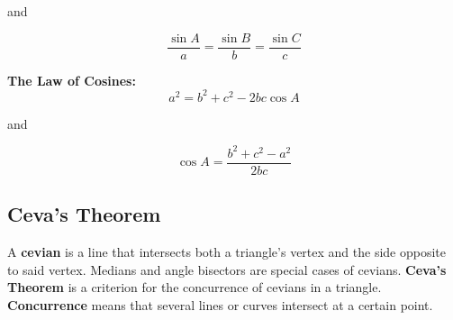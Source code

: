         \noindent and

        \begin{equation*}
            \frac{\sin{A}}{a} = \frac{\sin{B}}{b} = \frac{\sin{C}}{c}
        \end{equation*}

        \begin{center}
        \end{center}

        \noindent \color{purple} \textbf{The Law of Cosines:} \color{black} \\

        \begin{equation*}
            a^2 = b^2 + c^2 -2bc \cos{A}
        \end{equation*}

        \noindent and

        \begin{equation*}
            \cos{A}=\frac{b^2+c^2-a^2}{2bc}
        \end{equation*}



    \subsection{Ceva's Theorem}
        A \textbf{cevian} is a line that intersects both a triangle's vertex and the side
        opposite to said vertex. Medians and angle bisectors are special cases of cevians.
        \color{purple} \textbf{Ceva's Theorem} \color{black} is a criterion for the concurrence
        of cevians in a triangle. \textbf{Concurrence} means that several lines or curves
        intersect at a certain point. \\

